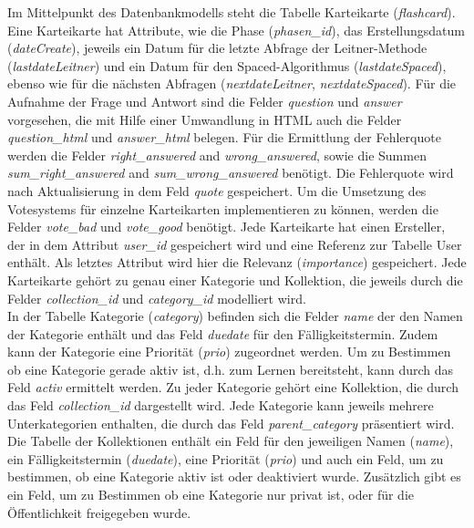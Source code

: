 Im Mittelpunkt des Datenbankmodells steht die Tabelle Karteikarte (\emph{flashcard}). Eine Karteikarte hat Attribute, wie die Phase (\emph{phasen{\_}id}), das Erstellungsdatum (\emph{dateCreate}), jeweils ein Datum für die letzte Abfrage der Leitner-Methode (\emph{lastdateLeitner}) und ein Datum für den Spaced-Algorithmus (\emph{lastdateSpaced}), ebenso wie für die nächsten Abfragen (\emph{nextdateLeitner}, \emph{nextdateSpaced}). Für die Aufnahme der Frage und Antwort sind die Felder \emph{question} und \emph{answer} vorgesehen, die mit Hilfe einer Umwandlung in HTML auch die Felder \emph{question{\_}html} und \emph{answer{\_}html} belegen. Für die Ermittlung der Fehlerquote werden die Felder \emph{right{\_}answered} and \emph{wrong{\_}answered}, sowie die Summen \emph{sum{\_}right{\_}answered} and \emph{sum{\_}wrong{\_}answered} benötigt. Die Fehlerquote wird nach Aktualisierung in dem Feld \emph{quote} gespeichert. Um die Umsetzung des Votesystems für einzelne Karteikarten implementieren zu können, werden die Felder \emph{vote{\_}bad} und \emph{vote{\_}good} benötigt. Jede Karteikarte hat einen Ersteller, der in dem Attribut \emph{user{\_}id} gespeichert wird und eine Referenz zur Tabelle User enthält. Als letztes Attribut wird hier die Relevanz (\emph{importance}) gespeichert. Jede Karteikarte gehört zu genau einer Kategorie und Kollektion, die jeweils durch die Felder \emph{collection{\_}id} und \emph{category{\_}id} modelliert wird. \\

In der Tabelle Kategorie (\emph{category}) befinden sich die Felder \emph{name} der den Namen der Kategorie enthält und das Feld \emph{duedate} für den Fälligkeitstermin. Zudem kann der Kategorie eine Priorität (\emph{prio}) zugeordnet werden. Um zu Bestimmen ob eine Kategorie gerade aktiv ist, d.h. zum Lernen bereitsteht, kann durch das Feld \emph{activ} ermittelt werden. Zu jeder Kategorie gehört eine Kollektion, die durch das Feld \emph{collection{\_}id} dargestellt wird. Jede Kategorie kann jeweils mehrere Unterkategorien enthalten, die durch das Feld \emph{parent{\_}category} präsentiert wird. \\

Die Tabelle der Kollektionen enthält ein Feld für den jeweiligen Namen (\emph{name}), ein Fälligkeitstermin (\emph{duedate}), eine Priorität (\emph{prio}) und auch ein Feld, um zu bestimmen, ob eine Kategorie aktiv ist oder deaktiviert wurde. Zusätzlich gibt es ein Feld, um zu Bestimmen ob eine Kategorie nur privat ist, oder für die Öffentlichkeit freigegeben wurde. \\

